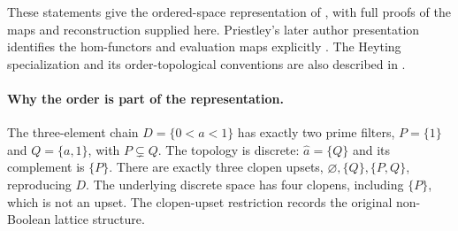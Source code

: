 These statements give the ordered-space representation of
\textcite{Priestley1970}, with full proofs of the maps and
reconstruction supplied here.
Priestley's later author presentation identifies the hom-functors
and evaluation maps explicitly
\cite[slides~17--20]{Priestley2019Slides}.
The Heyting specialization and its order-topological conventions
are also described in
\cite[\S2.3.3, pp.~33--37]{Bezhanishvili2006Thesis}.

\paragraph{Why the order is part of the representation.}
The three-element chain \(D=\{0<a<1\}\) has exactly two prime
filters, \(P=\{1\}\) and \(Q=\{a,1\}\), with \(P\subsetneq Q\).
The topology is discrete: \(\widehat a=\{Q\}\) and its complement
is \(\{P\}\).
There are exactly three clopen upsets,
\(\varnothing,\{Q\},\{P,Q\}\), reproducing \(D\).
The underlying discrete space has four clopens, including
\(\{P\}\), which is not an upset.
The clopen-upset restriction records the original non-Boolean
lattice structure.
